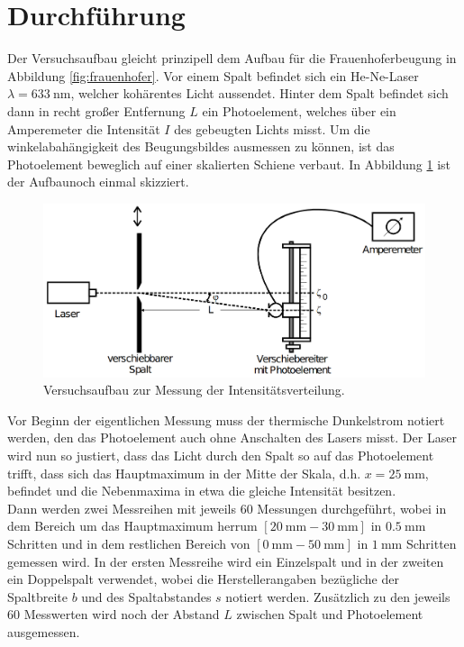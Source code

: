 \section{Durchführung}
\label{sec:Durchführung}
Der Versuchsaufbau gleicht prinzipell dem Aufbau für die Frauenhoferbeugung in Abbildung \ref{fig:frauenhofer}. Vor einem Spalt 
befindet sich ein He-Ne-Laser $\lambda=\SI{633}{\nano\metre}$, welcher kohärentes Licht aussendet. Hinter dem Spalt befindet sich dann in 
recht großer Entfernung $L$ ein Photoelement, welches über ein Amperemeter die Intensität $I$ des gebeugten Lichts misst. Um die 
winkelabahängigkeit des Beugungsbildes ausmessen zu können, ist das Photoelement beweglich auf einer skalierten Schiene verbaut.
In Abbildung \ref{fig:aufbau} ist der Aufbaunoch einmal skizziert.
\begin{figure}[H]
    \centering
    \includegraphics[scale = 0.35]{pictures/aufbau.png}
    \caption{Versuchsaufbau zur Messung der Intensitätsverteilung. \cite{AP01}}
    \label{fig:aufbau}
\end{figure}

\noindent
Vor Beginn der eigentlichen Messung muss der thermische Dunkelstrom notiert werden, den das Photoelement auch ohne Anschalten des Lasers
misst. Der Laser wird nun so justiert, dass das Licht durch den Spalt so auf das Photoelement trifft, dass sich das Hauptmaximum in der Mitte 
der Skala, d.h. $x=\SI{25}{\milli\metre}$, befindet und die Nebenmaxima in etwa die gleiche Intensität besitzen. 
\\\noindent
Dann werden zwei Messreihen 
mit jeweils $\num{60}$ Messungen durchgeführt, wobei in dem Bereich um das Hauptmaximum herrum $[\SI{20}{\milli\metre}-\SI{30}{\milli\metre}]$
in $\SI{0.5}{\milli\metre}$ Schritten und in dem restlichen Bereich von $[\SI{0}{\milli\metre}-\SI{50}{\milli\metre}]$ in $\SI{1}{\milli\metre}$
Schritten gemessen wird. In der ersten Messreihe wird ein Einzelspalt und in der zweiten ein Doppelspalt verwendet, wobei die 
Herstellerangaben bezügliche der Spaltbreite $b$ und des Spaltabstandes $s$ notiert werden. Zusätzlich zu den jeweils $\num{60}$ Messwerten 
wird noch der Abstand $L$ zwischen Spalt und Photoelement ausgemessen.  